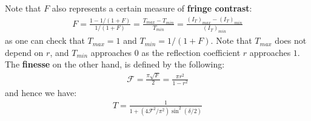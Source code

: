 \documentclass[11pt]{book}
\theoremstyle{break}
\theoremstyle{break}
\begin{document}
Note that $F$ also represents a certain measure of \textbf{fringe contrast}:
\begin{align*}
F = \frac{1-1/(1+F)}{1/(1+F)} =\frac{T_{max} - T_{min}}{T_{min}} = \frac{(I_T)_{max}-(I_T)_{min}}{(I_T)_{min}}
\end{align*}
as one can check that $T_{max}=1$ and $T_{min} = 1/(1+F)$. Note that $T_{max}$ does not depend on $r$, and $T_{min}$ approaches $0$ as the reflection coefficient $r$ approaches $1$.  The \textbf{finesse} on the other hand, is defined by the following:
\begin{align*}
\mathcal{F} = \frac{\pi \sqrt{F}}{2} = \frac{\pi r^2}{1-r^2}
\end{align*} 
and hence we have:
\begin{align*}
T = \frac{1}{1+(4 \mathcal{F}^2/\pi^2) \sin^2(\delta/2)}
\end{align*}
\end{document}
